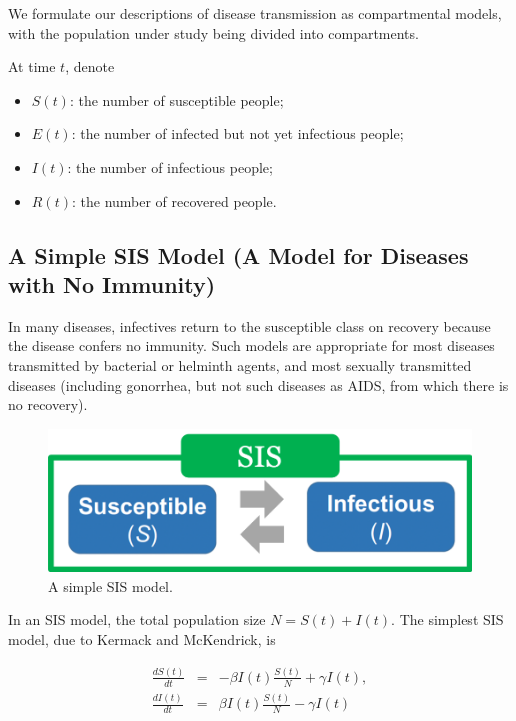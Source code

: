 \documentclass[]{book}
\providecommand{\tightlist}{%
  \setlength{\itemsep}{0pt}\setlength{\parskip}{0pt}}
\begin{document}
We formulate our descriptions of disease transmission as compartmental
models, with the population under study being divided into compartments.

At time \(t\), denote

\begin{itemize}
\tightlist
\item
  \(S(t)\): the number of susceptible people;
\item
  \(E(t)\): the number of infected but not yet infectious people;
\item
  \(I(t)\): the number of infectious people;
\item
  \(R(t)\): the number of recovered people.
\end{itemize}

\subsection{A Simple SIS Model (A Model for Diseases with No
Immunity)}\label{a-simple-sis-model-a-model-for-diseases-with-no-immunity}

In many diseases, infectives return to the susceptible class on recovery
because the disease confers no immunity. Such models are appropriate for
most diseases transmitted by bacterial or helminth agents, and most
sexually transmitted diseases (including gonorrhea, but not such
diseases as AIDS, from which there is no recovery).

\begin{figure}

{\centering \includegraphics[width=0.5\linewidth]{figures/SIS} 

}

\caption{A simple SIS model.}\label{fig:SIS}
\end{figure}

In an SIS model, the total population size \(N = S(t) + I(t)\). The
simplest SIS model, due to Kermack and McKendrick, is

\begin{eqnarray*}
\frac{dS(t)}{dt}& = & - \beta I(t)\frac{S(t)}{N} + \gamma I(t), \\
\frac{dI(t)}{dt}& = &\beta I(t)\frac{S(t)}{N} - \gamma I(t)
\end{eqnarray*}
\end{document}
